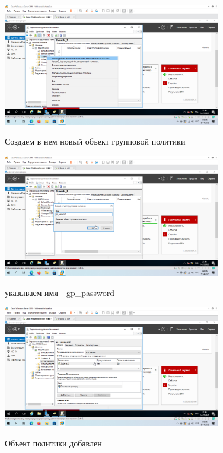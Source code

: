 \documentclass[a4paper]{article}
\begin{document}
  \begin{figure}[H]
    \centering
    \includegraphics[width=0.85\textwidth]{5_0110}
    \label{img:110}
    \caption{Создаем в нем новый объект групповой политики}
  \end{figure}

  \begin{figure}[H]
    \centering
    \includegraphics[width=0.85\textwidth]{5_0111}
    \label{img:111}
    \caption{указываем имя - gp\_password}
  \end{figure}

  \begin{figure}[H]
    \centering
    \includegraphics[width=0.85\textwidth]{5_0112}
    \label{img:112}
    \caption{Объект политики добавлен}
  \end{figure}
\end{document}
